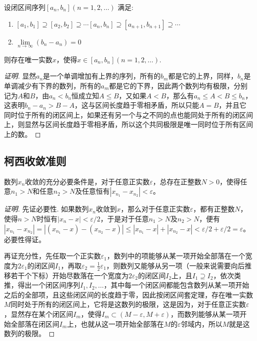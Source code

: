 \begin{theorem}[闭区间套定理]
  \label{closed-interval-sequence-theorem}
  设闭区间序列$[a_n,b_n](n=1,2,\ldots)$ 满足:
  \begin{enumerate}
  \item $[a_1,b_1] \supseteq [a_2,b_2] \supseteq \cdots [a_n,b_n] \supseteq [a_{n+1},b_{n+1}] \supseteq \cdots$
  \item $\lim\limits_{n \to \infty} (b_n-a_n) = 0$
  \end{enumerate}
    则存在唯一实数$x$，使得$x \in [a_n,b_n](n=1,2,\ldots)$.
\end{theorem}

\begin{proof}[证明]
  显然$a_n$是一个单调增加有上界的序列，所有的$b_m$都是它的上界，同样，$b_n$是单调减少有下界的数列，所有的$a_m$都是它的下界，因此两个数列均有极限，分别记为$A$和$B$，由$a_n < b_n$恒成立知$A \leqslant B$，又如果$A<B$，那么有$a_n\leqslant A < B \leqslant b_n$，这表明$b_n-a_n>B-A$，这与区间长度趋于零相矛盾，所以只能$A=B$，并且它同时位于所有的闭区间上，如果还有另一个与之不同的点也能同处于所有的闭区间上，则显然与区间长度趋于零相矛盾，所以这个共同极限是唯一同时位于所有区间上的数。
\end{proof}

\subsection{柯西收敛准则}
\label{sec:cauchy-convergence-rule}

\begin{theorem}[柯西收敛准则]
  数列$x_n$收敛的充分必要条件是，对于任意正实数$\varepsilon$，总存在正整数$N>0$，使得任意$n_1>N$和任意$n_2>N$及任意恒有$|x_{n_1}-x_{n_2}| < \varepsilon$。
\end{theorem}

\begin{proof}[证明]
  先证必要性. 如果数列$x_n$收敛到$x$，那么对于任意正实数$\varepsilon$，都有正整数$N$，使得$n>N$时恒有$|x_n-x|<\varepsilon / 2$，于是对于任意$n_1>N$及$n_2>N$，便有$|x_{n_1}-x_{n_2}|=|(x_{n_1}-x)- (x_{n_2}-x)|\leqslant |x_{n_1}-x|+|x_{n_2}-x|<\varepsilon / 2+\varepsilon / 2 = \varepsilon$。必要性得证。

  再证充分性，先任取一个正实数$\varepsilon_1$，数列中的项能够从某一项开始全部落在一个宽度为$2\varepsilon_1$的闭区间$I_1$，再取$\varepsilon_2 = \frac{1}{2}\varepsilon_1$，则数列又能够从另一项（一般来说需要向后推移若干个下标）开始尽数落在一个宽度为$2\varepsilon_2$的闭区间$I_2$上，且$I_1 \supseteq I_2$，依次类推，得出一个闭区间序列$I_1,I_2,\ldots$，其中每一个闭区间都能包含数列从某一项开始之后的全部项，且这些闭区间的长度趋于零，因此按闭区间套定理，存在唯一实数$M$同时处于所有的闭区间上，它将是这数列的极限，这是因为，对于任意正实数$\varepsilon$，显然存在某个闭区间$I_m$，使得$I_m \subset (M-\varepsilon,M+\varepsilon)$，而数列能够从某一项开始全部落在闭区间$I_m$上，也就从这一项开始全部落在$M$的$\varepsilon$邻域内，所以$M$就是这数列的极限。
\end{proof}

